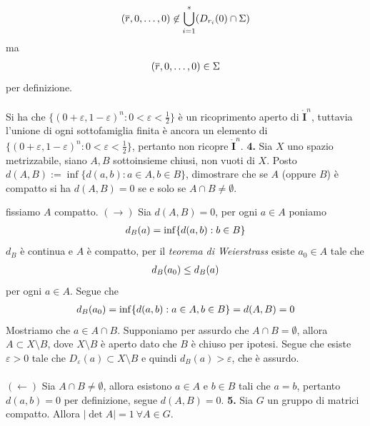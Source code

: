 \documentclass[oneside, 11pt]{amsbook}
\makeatletter
\newcommand{\0}{{(0)}}
\newcommand{\3}{{(3)}}
\theoremstyle{colonplain}
\theoremstyle{colondefinition}
\theoremstyle{colonremark}
\numberwithin{equation}{chapter}
\renewcommand{\proofname}{Dimostrazione}
\renewenvironment{proof}[1][\proofname]{\par
  \pushQED{\qed}%
  \normalfont \topsep6\p@\@plus6\p@\relax
  \trivlist
  \item[\hskip\labelsep\bfseries #1:]\ignorespaces
}{%
  \popQED\endtrivlist\@endpefalse
}
\makeatother
\begin{document}
\begin{proof}
\begin{align}
    (\overline{r}, 0, \dots, 0) \not\in \bigcup_{i = 1}^s (D_{r_i}(0) \cap \Sigma) \notag
\end{align}
ma
\begin{align}
    (\overline{r}, 0, \dots, 0) \in \Sigma \notag
\end{align}
per definizione. \\ \\
Si ha che $\{ (0 + \varepsilon, 1 - \varepsilon)^n : 0 < \varepsilon < \frac{1}{2} \}$ è un ricoprimento aperto di $\mathring{\mathbf{I}}^n$, tuttavia l'unione di ogni sottofamiglia finita è ancora un elemento di $\{ (0 + \varepsilon, 1 - \varepsilon)^n : 0 < \varepsilon < \frac{1}{2} \}$, pertanto non ricopre $\mathring{\mathbf{I}}^n$.
\end{proof}
\textbf{4.} Sia $X$ uno spazio metrizzabile, siano $A, B$ sottoinsieme chiusi, non vuoti di $X$. Posto $d(A, B) := \inf \{ d(a, b) : a \in A, b \in B \}$, dimostrare che se $A$ (oppure $B$) è compatto si ha $d(A,B) = 0$ se e solo se $A \cap B \neq \emptyset$.
\begin{proof}
fissiamo $A$ compatto. $(\rightarrow)$ Sia $d(A, B) = 0$, per ogni $a \in A$ poniamo
\begin{align}
    d_B(a) = \inf \{ d(a, b) : b \in B \} \notag
\end{align}
$d_B$ è continua e $A$ è compatto, per il \textit{teorema di Weierstrass} esiste $a_0 \in A$ tale che 
\begin{align}
    d_B(a_0) \leq d_B(a) \notag
\end{align}
per ogni $a \in A$. Segue che 
\begin{align}
    d_B(a_0) = \inf\{d(a, b) : a \in A, b \in B\} = d(A, B) = 0 \notag
\end{align}
Mostriamo che $a \in A \cap B$. Supponiamo per assurdo che $A \cap B = \emptyset$, allora $A \subset X \setminus B$, dove $X \setminus B$ è aperto dato che $B$ è chiuso per ipotesi. Segue che esiste $\varepsilon > 0$ tale che $D_\varepsilon(a) \subset X \setminus B$ e quindi $d_B(a) > \varepsilon$, che è assurdo. \\ \\
$(\leftarrow)$ Sia $A \cap B \neq \emptyset$, allora esistono $a \in A$ e $b \in B$ tali che $a = b$, pertanto $d(a, b) = 0$ per definizione, segue $d(A, B) = 0$.
\end{proof}
\textbf{5.} Sia $G$ un gruppo di matrici compatto. Allora $|\det A| = 1 \ \forall A \in G$.
\end{document}
